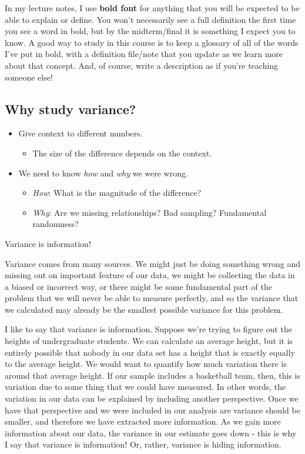 \documentclass[
  letterpaper,
  DIV=11,
  numbers=noendperiod]{scrreprt}
\providecommand{\tightlist}{%
  \setlength{\itemsep}{0pt}\setlength{\parskip}{0pt}}\usepackage{longtable,booktabs,array}
\begin{document}
In my lecture notes, I use \textbf{bold font} for anything that you will
be expected to be able to explain or define. You won't necessarily see a
full definition the first time you see a word in bold, but by the
midterm/final it is something I expect you to know. A good way to study
in this course is to keep a glossary of all of the words I've put in
bold, with a definition file/note that you update as we learn more about
that concept. And, of course, write a description as if you're teaching
someone else!

\hypertarget{why-study-variance}{%
\subsection{Why study variance?}\label{why-study-variance}}

\begin{itemize}
\tightlist
\item
  Give context to different numbers.

  \begin{itemize}
  \tightlist
  \item
    The size of the difference depends on the context.
  \end{itemize}
\item
  We need to know \emph{how} and \emph{why} we were wrong.

  \begin{itemize}
  \tightlist
  \item
    \emph{How}: What is the magnitude of the difference?
  \item
    \emph{Why}: Are we missing relationships? Bad sampling? Fundamental
    randomness?
  \end{itemize}
\end{itemize}

Variance is information!

Variance comes from many sources. We might just be doing something wrong
and missing out on important feature of our data, we might be collecting
the data in a biased or incorrect way, or there might be some
fundamental part of the problem that we will never be able to measure
perfectly, and so the variance that we calculated may already be the
smallest possible variance for this problem.

I like to say that variance is information. Suppose we're trying to
figure out the heights of undergraduate students. We can calculate an
average height, but it is entirely possible that nobody in our data set
has a height that is exactly equally to the average height. We would
want to quantify how much variation there is around that average height.
If our sample includes a basketball team, then, this is variation due to
some thing that we could have measured. In other words, the variation in
our data can be explained by including another perspective. Once we have
that perspective and we were included in our analysis are variance
should be smaller, and therefore we have extracted more information. As
we gain more information about our data, the variance in our estimate
goes down - this is why I say that variance is information! Or, rather,
variance is hiding information.
\end{document}
